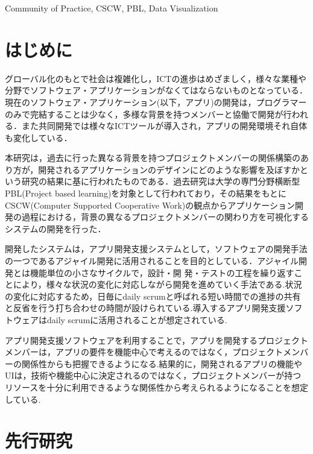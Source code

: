 \documentclass[submit,techrep]{ipsj}
\begin{document}
\begin{ekeyword}
Community of Practice, CSCW, PBL, Data Visualization
\end{ekeyword}

\maketitle

\section{はじめに}

グローバル化のもとで社会は複雑化し，ICTの進歩はめざましく，様々な業種や分野でソフトウェア・アプリケーションがなくてはならないものとなっている．現在のソフトウェア・アプリケーション(以下，アプリ)の開発は，プログラマーのみで完結することは少なく，多様な背景を持つメンバーと協働で開発が行われる．また共同開発では様々なICTツールが導入され，アプリの開発環境それ自体も変化している．


本研究は，過去に行った異なる背景を持つプロジェクトメンバーの関係構築のあり方が，開発されるアプリケーションのデザインにどのような影響を及ぼすかという研究の結果に基に行われたものである．過去研究は大学の専門分野横断型PBL(Project based learning)を対象として行われており，その結果をもとにCSCW(Computer Supported Cooperative Work)の観点からアプリケーション開発の過程における，背景の異なるプロジェクトメンバーの関わり方を可視化するシステムの開発を行った．


開発したシステムは，アプリ開発支援システムとして，ソフトウェアの開発手法の一つであるアジャイル開発に活用されることを目的としている．アジャイル開発とは機能単位の小さなサイクルで，設計・開 発・テストの工程を繰り返すことにより，様々な状況の変化に対応しながら開発を進めていく手法である.状況の変化に対応するため，日毎にdaily scrumと呼ばれる短い時間での進捗の共有と反省を行う打ち合わせの時間が設けられている.導入するアプリ開発支援ソフトウェアはdaily scrumに活用されることが想定されている.

アプリ開発支援ソフトウェアを利用することで，アプリを開発するプロジェクトメンバーは，アプリの要件を機能中心で考えるのではなく，プロジェクトメンバーの関係性からも把握できるようになる.結果的に，開発されるアプリの機能やUIは，技術や機能中心に決定されるのではなく，プロジェクトメンバーが持つリソースを十分に利用できるような関係性から考えられるようになることを想定している.

\section{先行研究}
\label{previous-research}
\end{document}
